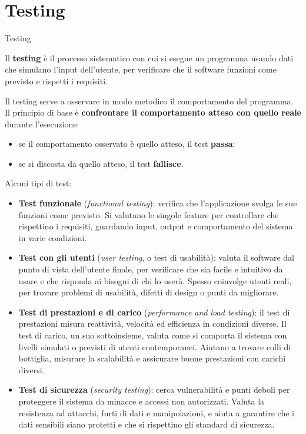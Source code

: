 \chapter{Testing}\label{ch-09}


\begin{boxdefinition}{Testing}

Il \textbf{testing} è il processo sistematico con cui si esegue un
programma usando dati che simulano l'input dell'utente, per verificare
che il software funzioni come previsto e rispetti i requisiti.

\end{boxdefinition}

Il testing serve a osservare in modo metodico il comportamento del
programma. Il principio di base è \textbf{confrontare il comportamento
atteso con quello reale} durante l'esecuzione:

\begin{itemize}
\tightlist
\item
  se il comportamento osservato è quello atteso, il test \textbf{passa};
\item
  se si discosta da quello atteso, il test \textbf{fallisce}.
\end{itemize}

Alcuni tipi di test:

\begin{itemize}
\tightlist
\item
  \textbf{Test funzionale} (\emph{functional testing}): verifica che
  l'applicazione svolga le sue funzioni come previsto. Si valutano le
  singole feature per controllare che rispettino i requisiti, guardando
  input, output e comportamento del sistema in varie condizioni.
\item
  \textbf{Test con gli utenti} (\emph{user testing}, o test di
  usabilità): valuta il software dal punto di vista dell'utente finale,
  per verificare che sia facile e intuitivo da usare e che risponda ai
  bisogni di chi lo userà. Spesso coinvolge utenti reali, per trovare
  problemi di usabilità, difetti di design o punti da migliorare.
\item
  \textbf{Test di prestazioni e di carico} (\emph{performance and load
  testing}): il test di prestazioni misura reattività, velocità ed
  efficienza in condizioni diverse. Il test di carico, un suo
  sottoinsieme, valuta come si comporta il sistema con livelli simulati
  o previsti di utenti contemporanei. Aiutano a trovare colli di
  bottiglia, misurare la scalabilità e assicurare buone prestazioni con
  carichi diversi.
\item
  \textbf{Test di sicurezza} (\emph{security testing}): cerca
  vulnerabilità e punti deboli per proteggere il sistema da minacce e
  accessi non autorizzati. Valuta la resistenza ad attacchi, furti di
  dati e manipolazioni, e aiuta a garantire che i dati sensibili siano
  protetti e che si rispettino gli standard di sicurezza.
\end{itemize}

